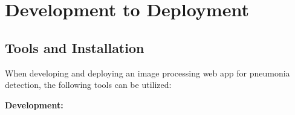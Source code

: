 %
%



\chapter{Development to Deployment}
\section{Tools and Installation}

When developing and deploying an image processing web app for pneumonia detection, the following tools can be utilized:



\textbf {Development:}

